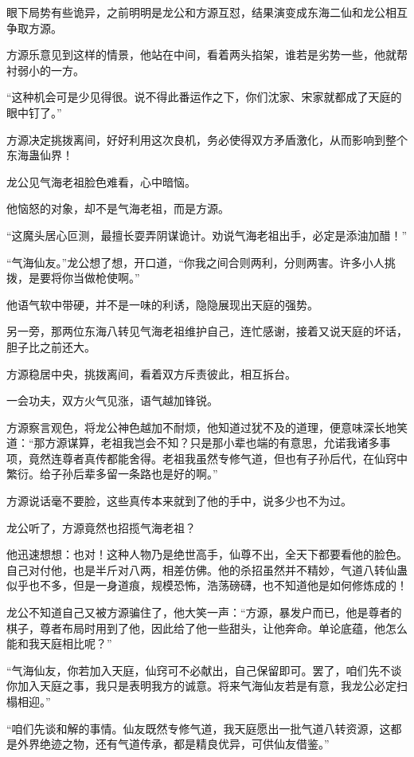 \begin{this_body}
眼下局势有些诡异，之前明明是龙公和方源互怼，结果演变成东海二仙和龙公相互争取方源。

方源乐意见到这样的情景，他站在中间，看着两头掐架，谁若是劣势一些，他就帮衬弱小的一方。

“这种机会可是少见得很。说不得此番运作之下，你们沈家、宋家就都成了天庭的眼中钉了。”

方源决定挑拨离间，好好利用这次良机，务必使得双方矛盾激化，从而影响到整个东海蛊仙界！

龙公见气海老祖脸色难看，心中暗恼。

他恼怒的对象，却不是气海老祖，而是方源。

“这魔头居心叵测，最擅长耍弄阴谋诡计。劝说气海老祖出手，必定是添油加醋！”

“气海仙友。”龙公想了想，开口道，“你我之间合则两利，分则两害。许多小人挑拨，是要将你当做枪使啊。”

他语气软中带硬，并不是一味的利诱，隐隐展现出天庭的强势。

另一旁，那两位东海八转见气海老祖维护自己，连忙感谢，接着又说天庭的坏话，胆子比之前还大。

方源稳居中央，挑拨离间，看着双方斥责彼此，相互拆台。

一会功夫，双方火气见涨，语气越加锋锐。

方源察言观色，将龙公神色越加不耐烦，他知道过犹不及的道理，便意味深长地笑道：“那方源谋算，老祖我岂会不知？只是那小辈也端的有意思，允诺我诸多事项，竟然连尊者真传都能舍得。老祖我虽然专修气道，但也有子孙后代，在仙窍中繁衍。给子孙后辈多留一条路也是好的啊。”

方源说话毫不要脸，这些真传本来就到了他的手中，说多少也不为过。

龙公听了，方源竟然也招揽气海老祖？

他迅速想想：也对！这种人物乃是绝世高手，仙尊不出，全天下都要看他的脸色。自己对付他，也是半斤对八两，相差仿佛。他的杀招虽然并不精妙，气道八转仙蛊似乎也不多，但是一身道痕，规模恐怖，浩荡磅礴，也不知道他是如何修炼成的！

龙公不知道自己又被方源骗住了，他大笑一声：“方源，暴发户而已，他是尊者的棋子，尊者布局时用到了他，因此给了他一些甜头，让他奔命。单论底蕴，他怎么能和我天庭相比呢？”

“气海仙友，你若加入天庭，仙窍可不必献出，自己保留即可。罢了，咱们先不谈你加入天庭之事，我只是表明我方的诚意。将来气海仙友若是有意，我龙公必定扫榻相迎。”

“咱们先谈和解的事情。仙友既然专修气道，我天庭愿出一批气道八转资源，这都是外界绝迹之物，还有气道传承，都是精良优异，可供仙友借鉴。”


\end{this_body}
